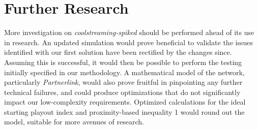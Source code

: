 \documentclass[12pt,a4paper]{article}
\begin{document}
\section{Further Research} \label{further}
More investigation on \textit{coolstreaming-spiked} should be performed ahead of its use in research. An updated simulation would prove beneficial to validate the issues identified with our first solution have been rectified by the changes since. Assuming this is successful, it would then be possible to perform the testing initially specified in our methodology. A mathematical model of the network, particularly \textit{Partnerlink}, would also prove fruitful in pinpointing any further technical failures, and could produce optimizations that do not significantly impact our low-complexity requirements. Optimized calculations for the ideal starting playout index and proximity-based inequality 1 would round out the model, suitable for more avenues of research.

\printbibliography
\end{document}

